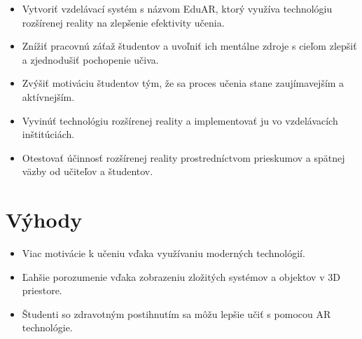 \documentclass[a4paper,12pt]{article}
\begin{document}
\begin{itemize}
    \item Vytvoriť vzdelávací systém s názvom EduAR, ktorý využíva technológiu rozšírenej reality na zlepšenie efektivity učenia.
    \item Znížiť pracovnú záťaž študentov a uvoľniť ich mentálne zdroje s cieľom zlepšiť a zjednodušiť pochopenie učiva.
    \item Zvýšiť motiváciu študentov tým, že sa proces učenia stane zaujímavejším a aktívnejším.
    \item Vyvinúť technológiu rozšírenej reality a implementovať ju vo vzdelávacích inštitúciách.
    \item Otestovať účinnosť rozšírenej reality prostredníctvom prieskumov a spätnej väzby od učiteľov a študentov.
\end{itemize}

\vspace{1em}
\section{Výhody}
\begin{itemize}
    \item Viac motivácie k učeniu vďaka využívaniu moderných technológií.
    \item Ľahšie porozumenie vďaka zobrazeniu zložitých systémov a objektov v 3D priestore.
    \item Študenti so zdravotným postihnutím sa môžu lepšie učiť s pomocou AR technológie.
\end{itemize}
\end{document}
